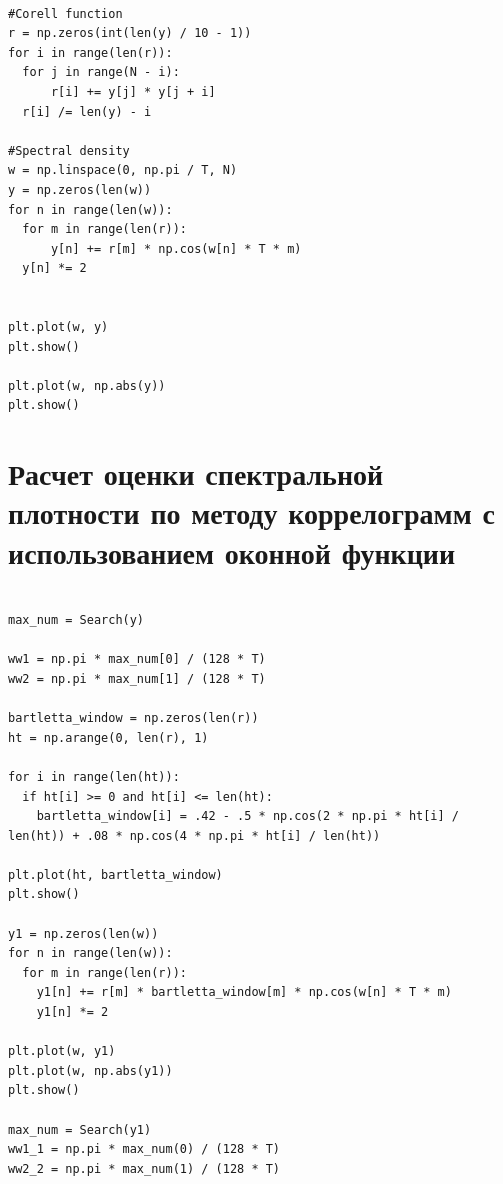 \documentclass[12pt]{article}
\begin{document}
\begin{lstlisting}

#Corell function
r = np.zeros(int(len(y) / 10 - 1))
for i in range(len(r)):
  for j in range(N - i):
      r[i] += y[j] * y[j + i]
  r[i] /= len(y) - i

#Spectral density
w = np.linspace(0, np.pi / T, N)
y = np.zeros(len(w))
for n in range(len(w)):
  for m in range(len(r)):
      y[n] += r[m] * np.cos(w[n] * T * m)
  y[n] *= 2


plt.plot(w, y)
plt.show()

plt.plot(w, np.abs(y))
plt.show()
\end{lstlisting}


\begin{figure}[!htb]
\centering
\caption{}
\label{}
\end{figure}

\begin{figure}[!htb]
\centering
\caption{}
\label{}
\end{figure}



\section{Расчет оценки спектральной плотности по методу коррелограмм с использованием оконной функции}

\begin{lstlisting}

max_num = Search(y)

ww1 = np.pi * max_num[0] / (128 * T)
ww2 = np.pi * max_num[1] / (128 * T)

bartletta_window = np.zeros(len(r))
ht = np.arange(0, len(r), 1)

for i in range(len(ht)):
  if ht[i] >= 0 and ht[i] <= len(ht):
    bartletta_window[i] = .42 - .5 * np.cos(2 * np.pi * ht[i] / len(ht)) + .08 * np.cos(4 * np.pi * ht[i] / len(ht))

plt.plot(ht, bartletta_window)
plt.show()

y1 = np.zeros(len(w))
for n in range(len(w)):
  for m in range(len(r)):
    y1[n] += r[m] * bartletta_window[m] * np.cos(w[n] * T * m)
    y1[n] *= 2

plt.plot(w, y1)
plt.plot(w, np.abs(y1))
plt.show()

max_num = Search(y1)
ww1_1 = np.pi * max_num(0) / (128 * T)
ww2_2 = np.pi * max_num(1) / (128 * T)
\end{lstlisting}
\end{document}

